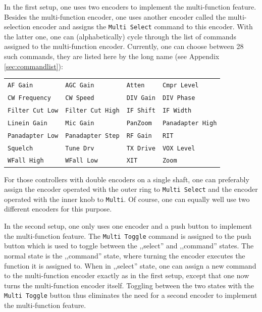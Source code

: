 \documentclass[12pt]{book}
\def\bltt#1{\texttt{\color{blue}#1}}
\begin{document}
In the first setup, one uses two encoders to implement the multi-function feature. Besides the multi-function
encoder, one uses another encoder called the multi-selection encoder and assigns
the \bltt{Multi Select} command to this encoder. With the latter one, one can
(alphabetically) cycle
through the list of commands assigned to the multi-function encoder. Currently, one can choose between
28 such commands, they are listed here by the long name (see Appendix \ref{sec:commandlist}):

\begin{center}
\begin{tabular}{llll}
\bltt{AF Gain}         & \bltt{AGC Gain} & \bltt{Atten}       & \bltt{Cmpr Level}     \\
\bltt{CW Frequency} & \bltt{CW Speed}        & \bltt{DIV Gain} & \bltt{DIV Phase}  \\
\bltt{Filter Cut Low} & \bltt{Filter Cut High} & \bltt{IF Shift}        & \bltt{IF Width} \\
\bltt{Linein Gain} & \bltt{Mic Gain}       & \bltt{PanZoom} & \bltt{Panadapter High} \\
\bltt{Panadapter Low} & \bltt{Panadapter Step} & \bltt{RF Gain} & \bltt{RIT} \\
\bltt{Squelch} & \bltt{Tune Drv} & \bltt{TX Drive} & \bltt{VOX Level}  \\
\bltt{WFall High} & \bltt{WFall Low} & \bltt{XIT} & \bltt{Zoom}
\end{tabular}
\end{center}

For those controllers with double encoders on a single shaft, one can preferably assign the encoder
operated with the outer ring  to \bltt{Multi Select} and the encoder operated with the inner
knob to \bltt{Multi}. Of course, one can equally well use two different encoders for this purpose.

In the second setup, one only uses one encoder and a push button to implement the multi-function
feature. The \bltt{Multi Toggle} command is assigned to the push button which is used to toggle
between the ,,select'' and ,,command'' states. The normal state is the ,,command'' state, where
turning the encoder executes the function it is assigned to. When in ,,select'' state, one can
assign a new command to the multi-function encoder exactly as in the first setup, except that
one now turns the multi-function encoder itself. Toggling between the
two states with the \bltt{Multi Toggle} button
thus eliminates the need for a second encoder to implement the multi-function feature.
\end{document}
